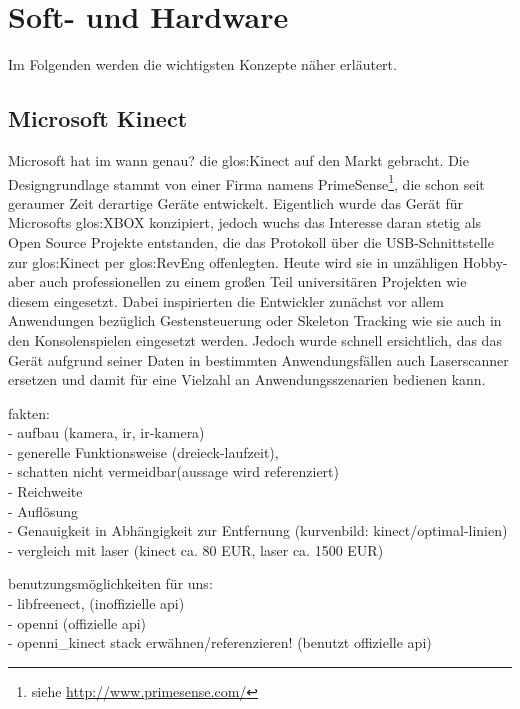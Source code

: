 \section{Soft- und Hardware}
\label{sec:softundhardware}

Im Folgenden werden die wichtigsten Konzepte näher erläutert.

\subsection{Microsoft Kinect}
\label{subsec:kinect}

Microsoft hat im {\color{red} wann genau?} die \gls{glos:Kinect} auf den Markt gebracht. Die Designgrundlage stammt von einer Firma namens PrimeSense\footnote{siehe \url{http://www.primesense.com/}}, die schon seit geraumer Zeit derartige Geräte entwickelt. Eigentlich wurde das Gerät für Microsofts \gls{glos:XBOX} konzipiert, jedoch wuchs das Interesse daran stetig als Open Source Projekte entstanden, die das Protokoll über die USB-Schnittstelle zur \gls{glos:Kinect} per \gls{glos:RevEng} offenlegten. Heute wird sie in unzähligen Hobby- aber auch professionellen zu einem großen Teil universitären Projekten wie diesem eingesetzt. Dabei inspirierten die Entwickler zunächst vor allem Anwendungen bezüglich Gestensteuerung oder Skeleton Tracking wie sie auch in den Konsolenspielen eingesetzt werden. Jedoch wurde schnell ersichtlich, das das Gerät aufgrund seiner Daten in bestimmten Anwendungsfällen auch Laserscanner ersetzen und damit für eine Vielzahl an Anwendungsszenarien bedienen kann.

{\color{red}
fakten:\\
- aufbau (kamera, ir, ir-kamera)\\
- generelle Funktionsweise (dreieck-laufzeit), \\
- schatten nicht vermeidbar(aussage wird referenziert)\\
- Reichweite\\
- Auflösung\\
- Genauigkeit in Abhängigkeit zur Entfernung (kurvenbild: kinect/optimal-linien)\\
- vergleich mit laser (kinect ca. 80 EUR, laser ca. 1500 EUR)\\
}

{\color{red}
benutzungsmöglichkeiten für uns:\\
- libfreenect, (inoffizielle api)\\
- openni (offizielle api)\\
- openni\_kinect stack erwähnen/referenzieren! (benutzt offizielle api)\\
}

